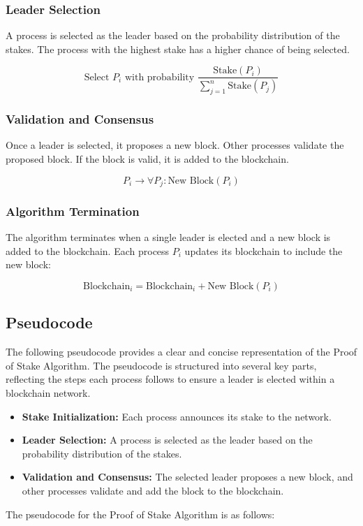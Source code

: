 \subsubsection{Leader Selection}

A process is selected as the leader based on the probability distribution of the stakes. The process with the highest stake has a higher chance of being selected.

\begin{equation}
\text{Select } P_i \text{ with probability } \frac{\text{Stake}(P_i)}{\sum_{j=1}^{n} \text{Stake}(P_j)}
\end{equation}

\subsubsection{Validation and Consensus}

Once a leader is selected, it proposes a new block. Other processes validate the proposed block. If the block is valid, it is added to the blockchain.

\begin{equation}
P_i \rightarrow \forall P_j: \text{New Block}(P_i)
\end{equation}

\subsubsection{Algorithm Termination}

The algorithm terminates when a single leader is elected and a new block is added to the blockchain. Each process \(P_i\) updates its blockchain to include the new block:

\begin{equation}
\text{Blockchain}_i = \text{Blockchain}_i + \text{New Block}(P_i)
\end{equation}

\subsection{Pseudocode}

The following pseudocode provides a clear and concise representation of the Proof of Stake Algorithm. The pseudocode is structured into several key parts, reflecting the steps each process follows to ensure a leader is elected within a blockchain network.

\begin{itemize}
    \item \textbf{Stake Initialization:} Each process announces its stake to the network.
    \item \textbf{Leader Selection:} A process is selected as the leader based on the probability distribution of the stakes.
    \item \textbf{Validation and Consensus:} The selected leader proposes a new block, and other processes validate and add the block to the blockchain.
\end{itemize}
The pseudocode for the Proof of Stake Algorithm is as follows:

